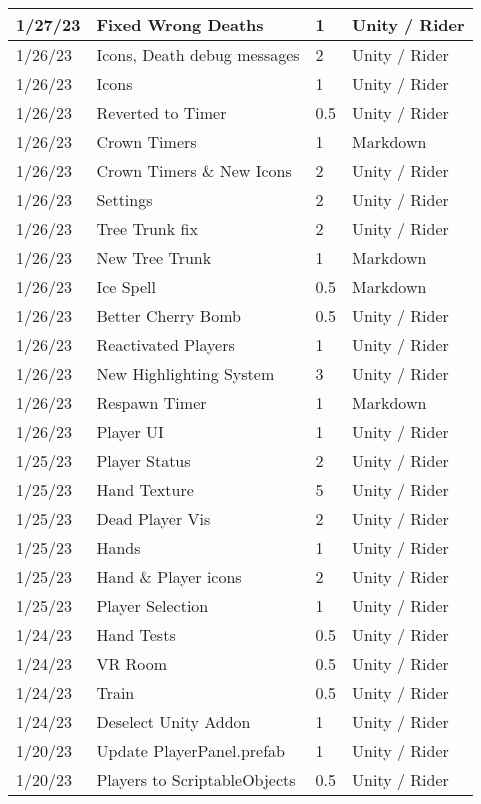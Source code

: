 \begin{longtable}{|p{1.5cm}|p{6cm}|p{1.2cm}|p{2.7cm}|}
	1/27/23 & Fixed Wrong Deaths & 1 & Unity / Rider \\ \hline
	1/26/23 & Icons, Death debug messages & 2 & Unity / Rider \\ \hline
	1/26/23 & Icons & 1 & Unity / Rider \\ \hline
	1/26/23 & Reverted to Timer & 0.5 & Unity / Rider \\ \hline
	1/26/23 & Crown Timers & 1 & Markdown \\ \hline
	1/26/23 & Crown Timers \& New Icons & 2 & Unity / Rider \\ \hline
	1/26/23 & Settings & 2 & Unity / Rider \\ \hline
	1/26/23 & Tree Trunk fix & 2 & Unity / Rider \\ \hline
	1/26/23 & New Tree Trunk & 1 & Markdown \\ \hline
	1/26/23 & Ice Spell & 0.5 & Markdown \\ \hline
	1/26/23 & Better Cherry Bomb & 0.5 & Unity / Rider \\ \hline
	1/26/23 & Reactivated Players & 1 & Unity / Rider \\ \hline
	1/26/23 & New Highlighting System & 3 & Unity / Rider \\ \hline
	1/26/23 & Respawn Timer & 1 & Markdown \\ \hline
	1/26/23 & Player UI & 1 & Unity / Rider \\ \hline
	1/25/23 & Player Status & 2 & Unity / Rider \\ \hline
	1/25/23 & Hand Texture & 5 & Unity / Rider \\ \hline
	1/25/23 & Dead Player Vis & 2 & Unity / Rider \\ \hline
	1/25/23 & Hands & 1 & Unity / Rider \\ \hline
	1/25/23 & Hand \& Player icons & 2 & Unity / Rider \\ \hline
	1/25/23 & Player Selection & 1 & Unity / Rider \\ \hline
	1/24/23 & Hand Tests & 0.5 & Unity / Rider \\ \hline
	1/24/23 & VR Room & 0.5 & Unity / Rider \\ \hline
	1/24/23 & Train & 0.5 & Unity / Rider \\ \hline
	1/24/23 & Deselect Unity Addon & 1 & Unity / Rider \\ \hline
	1/20/23 & Update PlayerPanel.prefab & 1 & Unity / Rider \\ \hline
	1/20/23 & Players to ScriptableObjects & 0.5 & Unity / Rider \\ \hline

\end{longtable}
